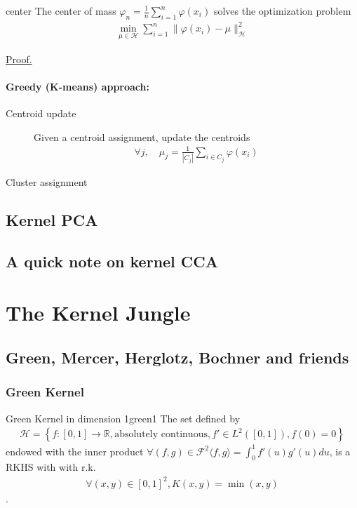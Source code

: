 \documentclass[10pt]{article}
\begin{document}
\begin{Proposition}{}{center}
  The center of mass $\varphi_n = \frac{1}{n}\sum_{i=1}^n\varphi(x_i)$ solves
  the optimization problem
  \begin{align*}
    \min_{\mu \in \mathcal{H}}\sum_{i=1}^n\lVert \varphi(x_i) - \mu 
    \rVert^2_\mathcal{H}
  \end{align*}
  \par \hfill \hyperref[prf:center]{\small Proof.}
\end{Proposition}

\paragraph{Greedy (K-means) approach:}
\begin{description}
  \item[Centroid update] Given a centroid assignment, update the centroids 
  \begin{align*}
    \forall j,\quad \mu_j = \frac{1}{|C_j|}\sum_{i\in C_j}\varphi(x_i)
  \end{align*} 
  \item[Cluster assignment] 
\end{description}

\subsection{Kernel PCA}

\subsection{A quick note on kernel CCA}

\section{The Kernel Jungle}
\subsection{Green, Mercer, Herglotz, Bochner and friends}

\subsubsection{Green Kernel}

\begin{Theorem}{Green Kernel in dimension 1}{green1}
  The set defined by
  \begin{align*}
    \mathcal{H} = \left\{f: [0, 1] \rightarrow \mathbb{R}, \text{absolutely 
    continuous}, f' \in L^2([0, 1]), f(0) = 0 \right\}
  \end{align*}
  endowed with the inner product $\forall (f, g) \in \mathcal{F}^2 \langle f, g
  \rangle = \int_0^1 f'(u)g'(u)du$, 
  is a RKHS with with r.k.
  \begin{align*}
    \forall (x, y) \in [0, 1]^2, K(x, y) = \min(x, y)
  \end{align*}.
\end{Theorem}
\end{document}
